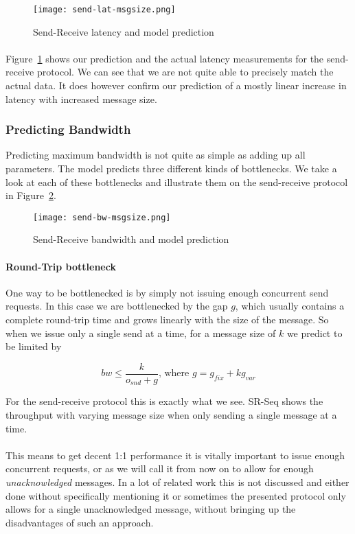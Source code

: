 \begin{figure}[ht]
  \centering
  \texttt{[image: send-lat-msgsize.png]}
  \caption{Send-Receive latency and model prediction}
    \label{fig:model-lat}
\end{figure}

\paragraph{} Figure~\ref{fig:model-lat} shows our prediction and the actual latency measurements for the send-receive protocol.
We can see that we are not quite able to precisely match the actual data. It does
however confirm our prediction of a mostly linear increase in latency with increased message size.


\subsubsection{Predicting Bandwidth}
Predicting maximum bandwidth is not quite as simple as adding up all parameters. The model predicts three different kinds of
bottlenecks. We take a look at each of these bottlenecks and illustrate them on the send-receive protocol in Figure~\ref{fig:model-bw}.

\begin{figure}[ht]
  \centering
  \texttt{[image: send-bw-msgsize.png]}
  \caption{Send-Receive bandwidth and model prediction}
    \label{fig:model-bw}
\end{figure}

\paragraph{Round-Trip bottleneck} One way to be bottlenecked is by simply not issuing enough concurrent send requests. In 
this case we are bottlenecked by the gap $g$, which usually contains a complete round-trip time and grows linearly with 
the size of the message. So when we issue only a single send at a time, for a message size of $k$ we predict to be limited by

$$
bw \leq \frac{k}{o_{snd} + g}\text{, where } g = g_{fix} + kg_{var} 
$$

For the send-receive protocol this is exactly what we see. SR-Seq shows the throughput with varying message size when only 
sending a single message at a time. 

\paragraph{} This means to get decent 1:1 performance it is vitally important to issue enough concurrent requests, or as we 
will call it from now on to allow for enough \emph{unacknowledged} messages. In a lot of related work this is not discussed
and either done without specifically mentioning it or sometimes the presented protocol only allows for a single unacknowledged
message, without bringing up the disadvantages of such an approach.


